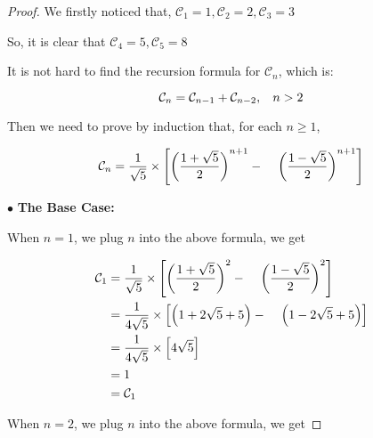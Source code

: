 \documentclass[12pt]{article}
\begin{document}
\begin{proof}
    We firstly noticed that, $\mathcal{C}_1 = 1, \mathcal{C}_2 = 2, \mathcal{C}_3 = 3 $

    \vspace*{0.3cm}
    \hspace*{1.2cm}
    So, it is clear that $\mathcal{C}_4 = 5, \mathcal{C}_5 = 8 $

    \vspace*{0.3cm}
    \hspace*{1.2cm}
    It is not hard to find the recursion formula for $\mathcal{C}_n$, which is:
    
    \[ \mathcal{C}_n = \mathcal{C}_{n-1} + \mathcal{C}_{n-2} ,\hspace*{0.3cm} n > 2 \]

    \vspace*{0.3cm}
    \hspace*{1.2cm}
    Then we need to prove by induction that, for each $n \geq 1$,

    \[ \mathcal{C}_{n} = \frac{1}{\sqrt{5}} \times \left[ \left( \frac{1+\sqrt{5}}{2} 
    \right)^{n+1} -  \hspace*{0.4cm}\left( \frac{1-\sqrt{5}}{2} \right)^{n+1} \right] \]
    
    \vspace*{0.3cm}
    \hspace*{1.2cm}
    $\bullet$ \textbf{The Base Case:}

    \vspace*{0.3cm}
    \hspace*{1.2cm}
    When $n=1$, we plug $n$ into the above formula, we get 
    

    \begin{align*}
        \mathcal{C}_{1} & = \frac{1}{\sqrt{5}} \times \left[ \left( \frac{1+\sqrt{5}}{2} 
    \right)^{2} -  \hspace*{0.4cm}\left( \frac{1-\sqrt{5}}{2} \right)^{2} \right] \\
        & = \frac{1}{4\sqrt{5}} \times \left[ \left( 1 + 2\sqrt{5}+5
        \right) -  \hspace*{0.4cm}\left( 1 - 2\sqrt{5}+5 \right) \right]\\
        & = \frac{1}{4\sqrt{5}} \times \left[ 4\sqrt{5} \right]\\
        & = 1 \\
        & = \mathcal{C}_1
    \end{align*}

    \vspace*{0.3cm}
    \hspace*{1.2cm}
    When $n=2$, we plug $n$ into the above formula, we get 
    


\end{proof}
\end{document}
